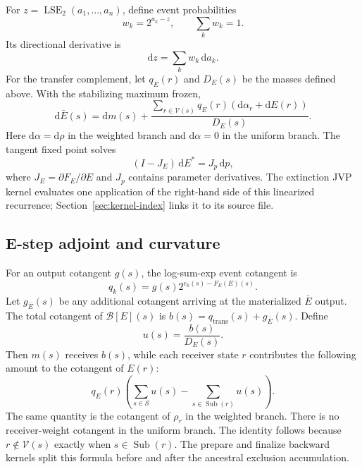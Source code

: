 \documentclass[11pt]{article}
\newcommand{\LSE}{\operatorname{LSE}_2}
\newcommand{\Sub}{\operatorname{Sub}}
\newcommand{\dd}{\mathrm{d}}
\begin{document}
For $z=\LSE(a_1,\ldots,a_n)$, define event probabilities
\begin{equation}
  w_k=2^{a_k-z}, \qquad \sum_k w_k=1.
  \label{eq:lse-weights}
\end{equation}
Its directional derivative is
\begin{equation}
  \dd z=\sum_k w_k\,\dd a_k.
  \label{eq:lse-jvp}
\end{equation}
For the transfer complement, let $q_E(r)$ and $D_E(s)$ be the masses defined
above.  With the stabilizing maximum frozen,
\begin{equation}
  \dd\bar E(s)
  =\dd m(s)
   +\frac{
     \sum_{r\in\mathcal V(s)}q_E(r)
       (\dd\alpha_r+\dd E(r))
   }{D_E(s)}.
  \label{eq:ebar-jvp}
\end{equation}
Here $\dd\alpha=\dd\rho$ in the weighted branch and $\dd\alpha=0$ in the
uniform branch.
The tangent fixed point solves
\begin{equation}
  (I-J_E)\,\dd E^*=J_p\,\dd p,
  \label{eq:e-tangent-fixed-point}
\end{equation}
where $J_E=\partial F_E/\partial E$ and $J_p$ contains parameter
derivatives.  The extinction JVP kernel evaluates one application of the
right-hand side of this linearized recurrence; Section~\ref{sec:kernel-index}
links it to its source file.

\subsection{E-step adjoint and curvature}

For an output cotangent $g(s)$, the log-sum-exp event cotangent is
\begin{equation}
  q_k(s)=g(s)2^{e_k(s)-F_E(E)(s)}.
  \label{eq:e-adjoint-event}
\end{equation}
Let $g_{\bar E}(s)$ be any additional cotangent arriving at the materialized
$\bar E$ output.  The total cotangent of $\mathcal B[E](s)$ is
$b(s)=q_{\mathrm{trans}}(s)+g_{\bar E}(s)$.  Define
\begin{equation}
  u(s)=\frac{b(s)}{D_E(s)}.
\end{equation}
Then $m(s)$ receives $b(s)$, while each receiver state $r$ contributes the
following amount to the cotangent of $E(r)$:
\begin{equation}
  q_E(r)\left(
    \sum_{s\in\mathcal S}u(s)-\sum_{s\in\Sub(r)}u(s)
  \right).
  \label{eq:complement-vjp}
\end{equation}
The same quantity is the cotangent of $\rho_r$ in the weighted branch.  There
is no receiver-weight cotangent in the uniform branch.  The identity follows
because $r\notin\mathcal V(s)$ exactly when $s\in\Sub(r)$.
The prepare and finalize backward kernels split this formula before and after
the ancestral exclusion accumulation.
\end{document}
